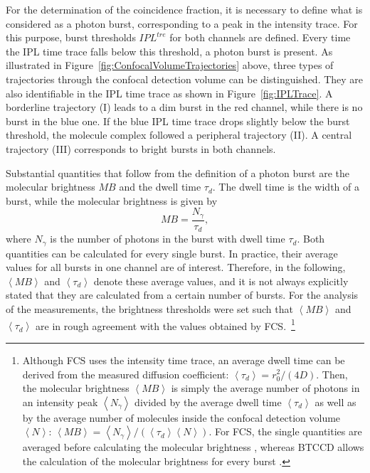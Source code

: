 For the determination of the coincidence fraction, it is necessary to define what is considered as a photon burst, corresponding to a peak in the intensity trace. For this purpose, burst thresholds $IPL^{tre}$ for both channels are defined. Every time the \gls{IPL} time trace falls below this threshold, a photon burst is present. As illustrated in Figure~\ref{fig:ConfocalVolumeTrajectories} above, three types of trajectories through the confocal detection volume can be distinguished. They are also identifiable in the \gls{IPL} time trace as shown in Figure~\ref{fig:IPLTrace}. A borderline trajectory (I) leads to a dim burst in the red channel, while there is no burst in the blue one. If the blue \gls{IPL} time trace drops slightly below the burst threshold, the molecule complex followed a peripheral trajectory (II). A central trajectory (III) corresponds to bright bursts in both channels. 

Substantial quantities that follow from the definition of a photon burst are the molecular brightness $MB$ and the dwell time $\tau_d$. The dwell time is the width of a burst, while the molecular brightness is given by
\begin{equation}
	MB = \frac{N_{\gamma}}{\tau_d},
\end{equation}
where $N_{\gamma}$ is the number of photons in the burst with dwell time $\tau_d$. Both quantities can be calculated for every single burst. In practice, their average values for all bursts in one channel are of interest. Therefore, in the following, $\left\langle MB \right\rangle$ and $\left\langle \tau_d \right\rangle$ denote these average values, and it is not always explicitly stated that they are calculated from a certain number of bursts. For the analysis of the measurements, the brightness thresholds were set such that $\left\langle MB \right\rangle$ and $\left\langle \tau_d \right\rangle$ are in rough agreement with the values obtained by \gls{FCS}.~\footnote{Although \gls{FCS} uses the intensity time trace, an average dwell time can be derived from the measured diffusion coefficient: $\left\langle \tau_d \right\rangle = r_0^2/ (4D)$. Then, the molecular brightness $\left\langle MB \right\rangle$ is simply the average number of photons in an intensity peak $\left\langle N_{\gamma} \right\rangle$ divided by the average dwell time $\left\langle \tau_d \right\rangle$ as well as by the average number of molecules inside the confocal detection volume $\left\langle N \right\rangle$: $\left\langle MB \right\rangle = \left\langle N_{\gamma} \right\rangle/ (\left\langle \tau_d \right\rangle \left\langle N \right\rangle)$. For \gls{FCS}, the single quantities are averaged before calculating the molecular brightness , whereas \gls{BTCCD} allows the calculation of the molecular brightness for every burst \cite{Schwille2001}.}
 
